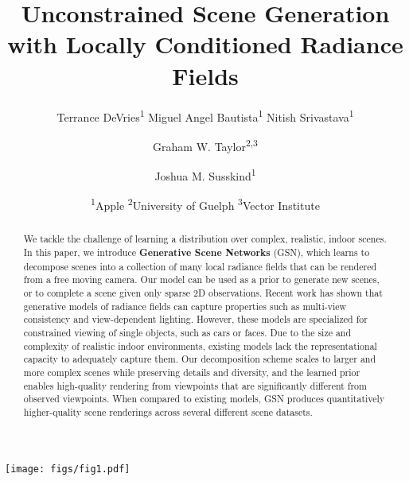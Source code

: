 \documentclass[10pt,twocolumn,letterpaper]{article}
\begin{document}
\title{Unconstrained Scene Generation with Locally Conditioned Radiance Fields}

\author{Terrance DeVries\textsuperscript{1} \quad \qquad Miguel Angel  Bautista\textsuperscript{1} \quad \qquad Nitish Srivastava\textsuperscript{1}
\and
Graham W. Taylor\textsuperscript{2,3}
\and
Joshua M. Susskind\textsuperscript{1}
\and
\textsuperscript{1}Apple\qquad
\textsuperscript{2}University of Guelph\qquad
\textsuperscript{3}Vector Institute
}
 
\maketitle
\ificcvfinal\thispagestyle{empty}\fi
 
\begin{strip}
\centering
\vspace{-4em}
\texttt{[image: figs/fig1.pdf]}
\label{fig:flythrough}
\end{strip}


\begin{abstract}
\vspace{-1.0em}
We tackle the challenge of learning a distribution over complex, realistic, indoor scenes. In this paper,
we introduce \textbf{Generative Scene Networks} (GSN), which learns to decompose scenes into a collection of many local radiance fields that can be rendered from a free moving camera. Our model can be used as a prior to generate new scenes, or to complete a scene given only sparse 2D observations.
Recent work has shown that generative models of radiance fields can capture properties such as multi-view consistency and view-dependent lighting. However, these models are specialized for constrained viewing of single objects, such as cars or faces.
Due to the size and complexity of realistic indoor environments, existing models lack the representational capacity to adequately capture them.
Our decomposition scheme scales to larger and more complex scenes while preserving details and diversity, and the learned prior enables high-quality rendering from viewpoints that are significantly different from observed viewpoints. When compared to existing models, GSN produces quantitatively higher-quality scene renderings  across several different scene datasets. 
\end{abstract}
\end{document}
